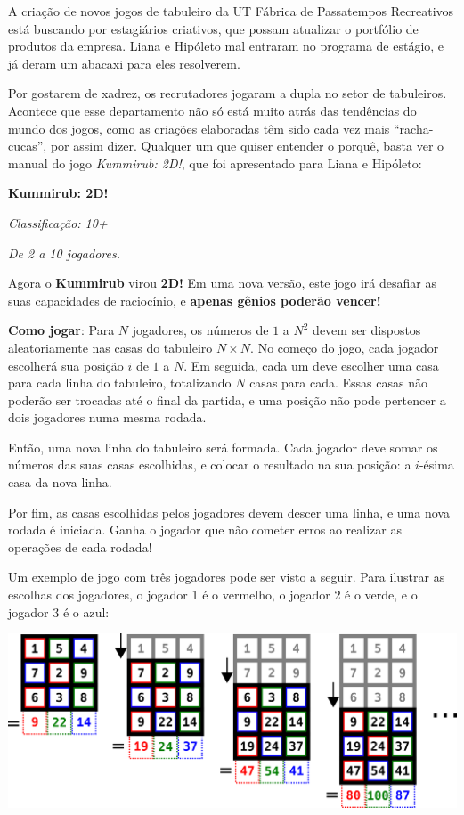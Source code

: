     A criação de novos jogos de tabuleiro da UT Fábrica de Passatempos Recreativos está buscando por estagiários criativos, que possam atualizar o portfólio de produtos da empresa. Liana e Hipóleto mal entraram no programa de estágio, e já deram um abacaxi para eles resolverem.

    Por gostarem de xadrez, os recrutadores jogaram a dupla no setor de tabuleiros. Acontece que esse departamento não só está muito atrás das tendências do mundo dos jogos, como as criações elaboradas têm sido cada vez mais ``racha-cucas'', por assim dizer. Qualquer um que quiser entender o porquê, basta ver o manual do  jogo \textit{Kummirub: 2D!}, que foi apresentado para Liana e Hipóleto:

\begin{displayquote}
    \textbf{Kummirub: 2D!}

    \textit{Classificação: 10+}

    \textit{De 2 a 10 jogadores.}

    Agora o \textbf{Kummirub} virou \textbf{2D!} Em uma nova versão, este jogo irá desafiar as suas capacidades de raciocínio, e \textbf{apenas gênios poderão vencer!}
    
    \textbf{Como jogar}: Para $N$ jogadores, os números de $1$ a $N^2$ devem ser dispostos aleatoriamente nas casas do tabuleiro $N \times N$. No começo do jogo, cada jogador escolherá sua posição $i$ de $1$ a $N$. Em seguida, cada um deve escolher uma casa para cada linha do tabuleiro, totalizando $N$ casas para cada. Essas casas não poderão ser trocadas até o final da partida, e uma posição não pode pertencer a dois jogadores numa mesma rodada.

    Então, uma nova linha do tabuleiro será formada. Cada jogador deve somar os números das suas casas escolhidas, e colocar o resultado na sua posição: a $i$-ésima casa da nova linha.

    Por fim, as casas escolhidas pelos jogadores devem descer uma linha, e uma nova rodada é iniciada. Ganha o jogador que não cometer erros ao realizar as operações de cada rodada!

    Um exemplo de jogo com três jogadores pode ser visto a seguir. Para ilustrar as escolhas dos jogadores, o jogador 1 é o vermelho, o jogador 2 é o verde, e o jogador 3 é o azul:
\end{displayquote}

\begin{center}
    \includegraphics[scale=0.4]{kummirub/exemplo.png}
\end{center}

